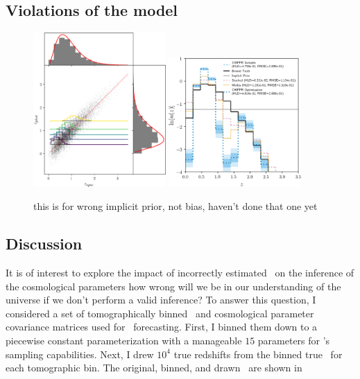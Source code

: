 \subsection{Violations of the model}


\begin{figure}
	\begin{center}
		\includegraphics[width=0.45\textwidth]{figures/chippr/wrong_scatter.png}
		\includegraphics[width=0.45\textwidth]{figures/chippr/wrong_log_estimators.png}
		\caption{this is for wrong implicit prior, not bias, haven't done that one yet}
	\end{center}
\end{figure} 

\subsection{Discussion}

It is of interest to explore the impact of incorrectly estimated \nz\ on the inference of the cosmological parameters \textemdash how wrong will we be in our understanding of the universe if we don't perform a valid inference?
To answer this question, I considered a set of tomographically binned \nz\ and cosmological parameter covariance matrices used for \desc\ forecasting.
First, I binned them down to a piecewise constant parameterization with a manageable $15$ parameters for \chippr's sampling capabilities.
Next, I drew $10^{4}$ true redshifts from the binned true \nz\ for each tomographic bin.
The original, binned, and drawn \nz\ are shown in 


